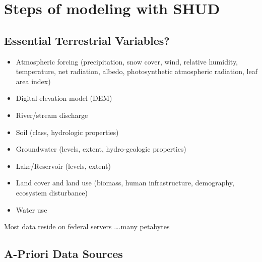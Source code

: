 \documentclass[]{scrbook}
\providecommand{\tightlist}{%
  \setlength{\itemsep}{0pt}\setlength{\parskip}{0pt}}
\begin{document}
\section{Steps of modeling with SHUD}\label{steps-of-modeling-with-shud}

\subsection{Essential Terrestrial
Variables?}\label{essential-terrestrial-variables}

\begin{itemize}
\tightlist
\item
  Atmospheric forcing (precipitation, snow cover, wind, relative
  humidity, temperature, net radiation, albedo, photosynthetic
  atmospheric radiation, leaf area index)
\item
  Digital elevation model (DEM)
\item
  River/stream discharge
\item
  Soil (class, hydrologic properties)
\item
  Groundwater (levels, extent, hydro-geologic properties)
\item
  Lake/Reservoir (levels, extent)
\item
  Land cover and land use (biomass, human infrastructure, demography,
  ecosystem disturbance)
\item
  Water use
\end{itemize}

Most data reside on federal servers \ldots{}.many petabytes

\subsection{A-Priori Data Sources}\label{a-priori-data-sources}
\end{document}
